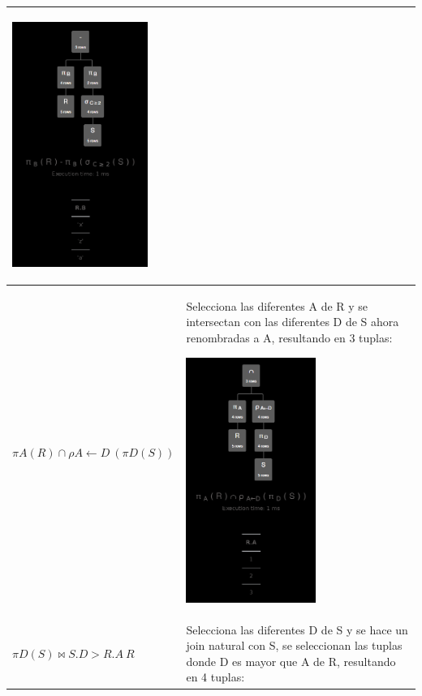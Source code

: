 \begin{longtable}{|p{4.3cm}|p{12cm}|}
    \begin{center}
        \includegraphics[height=8cm]{../resources/pregunta1/1.7.png}
    \end{center}
    \\ \hline
    
    \textbf{$\pi A (R) \cap \rho A \leftarrow D \ (\pi D (S))$} & 
    Selecciona las diferentes A de R y se intersectan con las diferentes D de S ahora renombradas a A, resultando en 3 tuplas:

    \begin{center}
        \includegraphics[height=8cm]{../resources/pregunta1/1.8.png}
    \end{center}
    \\ \hline
    
    \textbf{$\pi D (S) \bowtie S.D > R.A \ R$} & 
    Selecciona las diferentes D de S y se hace un join natural con S, se seleccionan las tuplas donde D es mayor que A de R, resultando en 4 tuplas:


\end{longtable}
